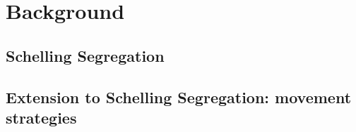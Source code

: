 \section{Background}
\subsection{Schelling Segregation}

\subsection{Extension to Schelling Segregation: movement strategies}